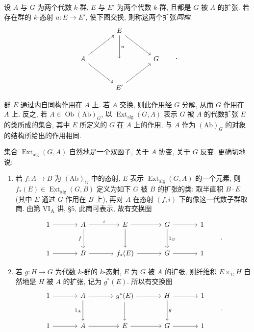 
设 \(A\) 与 \(G\) 为两个代数 \(k\)-群,
\(E\) 与 \(E'\) 为两个代数 \(k\)-群, 且都是 \(G\) 被 \(A\) 的扩张.
若存在群的 \(k\)-态射 \(u:E\to E'\), 使下图交换, 则称这两个扩张\emph{同构}:
\[
\begin{tikzcd}[column sep=large,row sep=large]
  {} & E \arrow[dr] \arrow[d,"u"] & {} \\
  A \arrow[ur] \arrow[dr] & {} & G \\
  {} & E' \arrow[ur] & {}
\end{tikzcd}
\qquad .
\]

群 \(E\) 通过内自同构作用在 \(A\) 上.
若 \(A\) 交换, 则此作用经 \(G\) 分解, 从而 \(G\) 作用在 \(A\) 上.
反之, 若 \(A\in\operatorname{Ob}(\mathrm{Ab})_G\),
以 \(\operatorname{Ext}_{\mathrm{alg}}(G,A)\) 表示 \(G\) 被 \(A\) 的代数扩张 \(E\)
的类所成的集合, 其中 \(E\) 所定义的 \(G\) 在 \(A\) 上的作用,
与 \(A\) 作为 \((\mathrm{Ab})_G\) 的对象的结构所给出的作用相同.

集合 \(\operatorname{Ext}_{\mathrm{alg}}(G,A)\) 自然地是一个双函子,
关于 \(A\) 协变, 关于 \(G\) 反变. 更确切地说:
\begin{enumerate}
\item[(a)] 
若 \(f:A\to B\) 为 \((\mathrm{Ab})_G\) 中的态射,
\(E\) 表示 \(\operatorname{Ext}_{\mathrm{alg}}(G,A)\) 的一个元素,
则 \(f_*(E)\in\operatorname{Ext}_{\mathrm{alg}}(G,B)\) 定义为如下 \(G\) 被 \(B\)
的扩张的类: 取半直积 \(B\mathbin{\cdot}E\)
(其中 \(E\) 通过 \(G\) 作用在 \(B\) 上),
再对 \(A\) 在态射 \((f,i)\) 下的像这一代数子群取商.
由第 VI\textsubscript{A} 讲, \S5, 此商可表示, 故有交换图
  \[
  \begin{tikzcd}[column sep=large,row sep=large]
    1 \arrow[r] &
    A \arrow[r,"i"] \arrow[d,"f"'] &
    E \arrow[r] \arrow[d] &
    G \arrow[r] \arrow[d,"1_G"] &
    1 \\
    1 \arrow[r] &
    B \arrow[r] &
    f_*(E) \arrow[r] &
    G \arrow[r] &
    1
  \end{tikzcd}
  \qquad .
  \]

\item[(b)] 
若 \(g:H\to G\) 为代数 \(k\)-群的 \(k\)-态射,
\(E\) 为 \(G\) 被 \(A\) 的扩张,
则纤维积 \(E\times_G H\) 自然地是 \(H\) 被 \(A\) 的扩张, 记为 \(g^*(E)\).
所以有交换图
  \[
  \begin{tikzcd}[column sep=large,row sep=large]
    1 \arrow[r] &
    A \arrow[r] \arrow[d,"1_A"'] &
    g^*(E) \arrow[r] \arrow[d] &
    H \arrow[r] \arrow[d,"g"] &
    1 \\
    1 \arrow[r] &
    A \arrow[r] &
    E \arrow[r] &
    G \arrow[r] &
    1
  \end{tikzcd}
  \qquad .
  \]
\end{enumerate}

